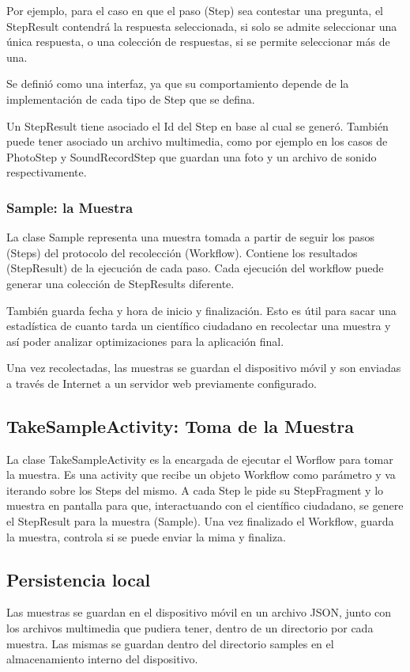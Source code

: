 Por ejemplo, para el caso en que el paso (Step) sea contestar una pregunta, el StepResult contendrá la respuesta seleccionada, si solo se admite seleccionar una única respuesta, o una colección de respuestas, si se permite seleccionar más de una.

Se definió como una interfaz, ya que su comportamiento depende de la implementación de cada tipo de Step que se defina.

Un StepResult tiene asociado el Id del Step en base al cual se generó. También puede tener asociado un archivo multimedia, como por ejemplo en los casos de PhotoStep y SoundRecordStep que guardan una foto y un archivo de sonido respectivamente.


\subsubsection{Sample: la Muestra}
La clase Sample representa una muestra tomada a partir de seguir los pasos (Steps) del protocolo del recolección (Workflow). Contiene los resultados (StepResult) de la ejecución de cada paso. Cada ejecución del workflow puede generar una colección de StepResults diferente.

También guarda fecha y hora de inicio y finalización. Esto es útil para sacar una estadística de cuanto tarda un científico ciudadano en recolectar una muestra y así poder analizar optimizaciones para la aplicación final.

Una vez recolectadas, las muestras se guardan el dispositivo móvil y son enviadas a través de Internet a un servidor web previamente configurado.

\subsection{TakeSampleActivity: Toma de la Muestra}
La clase TakeSampleActivity es la encargada de ejecutar el Worflow para tomar la muestra. Es una activity que recibe un objeto Workflow como parámetro y va iterando sobre los Steps del mismo. A cada Step le pide su StepFragment y lo muestra en pantalla para que, interactuando con el científico ciudadano, se genere el StepResult para la muestra (Sample). Una vez finalizado el Workflow, guarda la muestra, controla si se puede enviar la mima y finaliza.



\subsection{Persistencia local}
Las muestras se guardan en el dispositivo móvil en un archivo JSON, junto con los archivos multimedia que pudiera tener, dentro de un directorio por cada muestra. Las mismas se guardan dentro del directorio samples en el almacenamiento interno del dispositivo.

